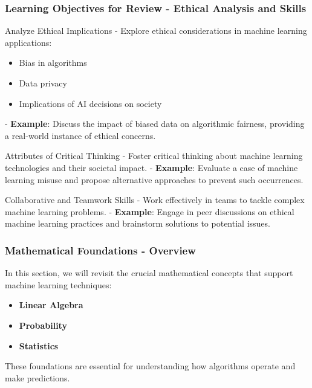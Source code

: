 \documentclass[aspectratio=169]{beamer}
\begin{document}
\begin{frame}[fragile]
    \frametitle{Learning Objectives for Review - Ethical Analysis and Skills}
    \begin{block}{Analyze Ethical Implications}
        - Explore ethical considerations in machine learning applications:
          \begin{itemize}
              \item Bias in algorithms
              \item Data privacy
              \item Implications of AI decisions on society
          \end{itemize}
        - \textbf{Example}: Discuss the impact of biased data on algorithmic fairness, providing a real-world instance of ethical concerns.
    \end{block}

    \begin{block}{Attributes of Critical Thinking}
        - Foster critical thinking about machine learning technologies and their societal impact.
        - \textbf{Example}: Evaluate a case of machine learning misuse and propose alternative approaches to prevent such occurrences.
    \end{block}

    \begin{block}{Collaborative and Teamwork Skills}
        - Work effectively in teams to tackle complex machine learning problems.
        - \textbf{Example}: Engage in peer discussions on ethical machine learning practices and brainstorm solutions to potential issues.
    \end{block}
\end{frame}

\begin{frame}[fragile]
    \frametitle{Mathematical Foundations - Overview}
    In this section, we will revisit the crucial mathematical concepts that support machine learning techniques:
    \begin{itemize}
        \item \textbf{Linear Algebra}
        \item \textbf{Probability}
        \item \textbf{Statistics}
    \end{itemize}
    These foundations are essential for understanding how algorithms operate and make predictions.
\end{frame}
\end{document}
